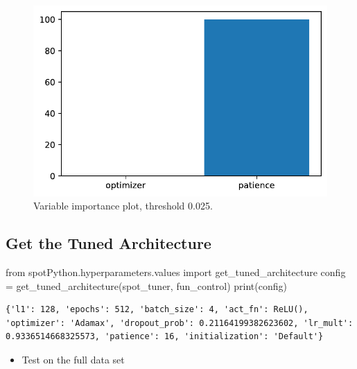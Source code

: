 \documentclass[
  letterpaper,
  DIV=11,
  numbers=noendperiod]{scrreprt}
\newenvironment{Shaded}{\begin{snugshade}}{\end{snugshade}}
\newcommand{\BuiltInTok}[1]{\textcolor[rgb]{0.00,0.23,0.31}{#1}}
\newcommand{\ImportTok}[1]{\textcolor[rgb]{0.00,0.46,0.62}{#1}}
\newcommand{\NormalTok}[1]{\textcolor[rgb]{0.00,0.23,0.31}{#1}}
\newcommand{\OperatorTok}[1]{\textcolor[rgb]{0.37,0.37,0.37}{#1}}
\providecommand{\tightlist}{%
  \setlength{\itemsep}{0pt}\setlength{\parskip}{0pt}}\usepackage{longtable,booktabs,array}
\begin{document}
\begin{figure}[H]

{\centering \includegraphics{032_spot_lightning_rnn_diabetes_files/figure-pdf/cell-17-output-1.pdf}

}

\caption{Variable importance plot, threshold 0.025.}

\end{figure}%

\subsection{Get the Tuned Architecture}\label{sec-get-spot-results-32}

\begin{Shaded}
\begin{Highlighting}[]
\ImportTok{from}\NormalTok{ spotPython.hyperparameters.values }\ImportTok{import}\NormalTok{ get\_tuned\_architecture}
\NormalTok{config }\OperatorTok{=}\NormalTok{ get\_tuned\_architecture(spot\_tuner, fun\_control)}
\BuiltInTok{print}\NormalTok{(config)}
\end{Highlighting}
\end{Shaded}

\begin{verbatim}
{'l1': 128, 'epochs': 512, 'batch_size': 4, 'act_fn': ReLU(), 'optimizer': 'Adamax', 'dropout_prob': 0.21164199382623602, 'lr_mult': 0.9336514668325573, 'patience': 16, 'initialization': 'Default'}
\end{verbatim}

\begin{itemize}
\tightlist
\item
  Test on the full data set
\end{itemize}
\end{document}
